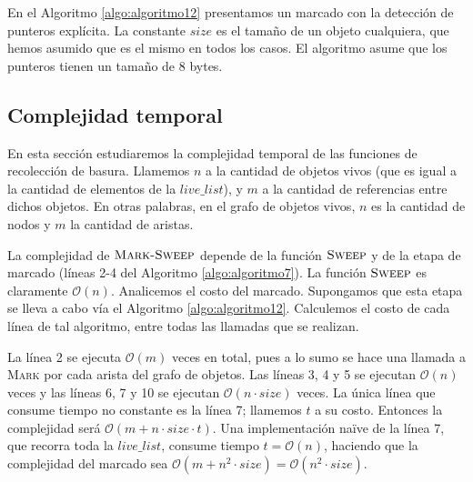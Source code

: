\begin{algorithm}
	\DontPrintSemicolon
	\Output{-}
 	\BlankLine
\caption{$\textsc{Mark}$}
\label{algo:algoritmo12}
\end{algorithm}

En el Algoritmo \ref{algo:algoritmo12} presentamos un marcado con la detección de punteros explícita. La constante $size$ es el tamaño de un objeto cualquiera, que hemos asumido que es el mismo en todos los casos. El algoritmo asume que los punteros tienen un tamaño de 8 bytes.

\subsection{Complejidad temporal}

En esta sección estudiaremos la complejidad temporal de las funciones de recolección de basura. Llamemos $n$ a la cantidad de objetos vivos (que es igual a la cantidad de elementos de la $live\_list$), y $m$ a la cantidad de referencias entre dichos objetos. En otras palabras, en el grafo de objetos vivos, $n$ es la cantidad de nodos y $m$ la cantidad de aristas.

La complejidad de $\textsc{Mark-Sweep}$ depende de la función $\textsc{Sweep}$ y de la etapa de marcado (líneas 2-4 del Algoritmo \ref{algo:algoritmo7}). La función $\textsc{Sweep}$ es claramente $\mathcal{O}(n)$. Analicemos el costo del marcado. Supongamos que esta etapa se lleva a cabo vía el Algoritmo \ref{algo:algoritmo12}. Calculemos el costo de cada línea de tal algoritmo, entre todas las llamadas que se realizan. 

La línea 2 se ejecuta $\mathcal{O}(m)$ veces en total, pues a lo sumo se hace una llamada a \textsc{Mark} por cada arista del grafo de objetos. Las líneas 3, 4 y 5 se ejecutan $\mathcal{O}(n)$ veces y las líneas 6, 7 y 10 se ejecutan $\mathcal{O}(n \cdot size)$ veces. La única línea que consume tiempo no constante es la línea 7; llamemos $t$ a su costo. Entonces la complejidad será $\mathcal{O}(m + n \cdot size \cdot t)$. Una implementación naïve de la línea 7, que recorra toda la $live\_list$, consume tiempo $t = \mathcal{O}(n)$, haciendo que la complejidad del marcado sea $\mathcal{O}(m + n^2 \cdot size) = \mathcal{O}(n^2 \cdot size)$.

